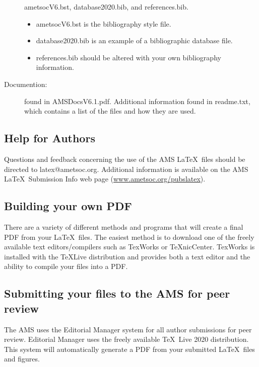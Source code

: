 \documentclass{ametsocV6.1}
\begin{document}
\begin{description}
ametsocV6.bst, database2020.bib, and references.bib.

\begin{itemize}
\item
ametsocV6.bst is the bibliography style file.

\item
database2020.bib is an example of a bibliographic database file.

\item
references.bib should be altered with your own bibliography information.
\end{itemize}



\item[Documention:] found in AMSDocsV6.1.pdf. Additional information
found in
readme.txt, which contains a list of the files and how they are used.

\end{description}

\subsection{Help for Authors}
Questions and feedback concerning the use of the AMS \LaTeX\ files should be
directed to latex@ametsoc.org. Additional information is available on the AMS
\LaTeX\ Submission Info web page (\url{www.ametsoc.org/pubslatex}).



\appendix[C]

\subsection{Building your own PDF}
There are a variety of different methods and programs that will create a
final PDF from your \LaTeX\ files. The easiest method is to download one of
the freely available text editors/compilers such as TexWorks or TeXnicCenter.
TexWorks is installed with the TeXLive distribution and provides both a text
editor and the ability to compile your files into a PDF.

\subsection{Submitting your files to the AMS for peer review}
The AMS uses the Editorial Manager system for all author submissions for
peer review. Editorial Manager uses the freely available \TeX\ Live 2020
distribution. This system will automatically generate a PDF from your
submitted \LaTeX\ files and figures.
\end{document}
